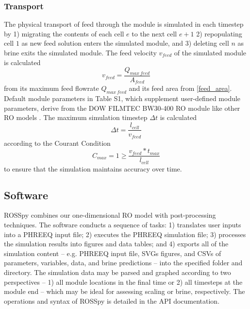 \subsubsection{Transport}
The physical transport of feed through the module is simulated in each timestep by 1) migrating the contents of each cell $e$ to the next cell $e+1$ 2) repopulating cell $1$ as new feed solution enters the simulated module, and 3) deleting cell $n$ as brine exits the simulated module. The feed velocity $v_{feed}$ of the simulated module is calculated
\begin{equation} \label{feed_velocity}
    v_{feed}=\frac{Q_{max~feed}}{A_{feed}}
\end{equation}
from its maximum feed flowrate $Q_{max~feed}$ and its feed area from \cref{feed_area}. Default module parameters in Table S1, which supplement user-defined module parameters, derive from the DOW FILMTEC BW30-400 RO module like other RO models \cite{Li2012OptimalDesalination}. The maximum simulation timestep $\Delta t$ is calculated
\begin{equation} \label{timestep}
    \Delta t=\frac{l_{cell}}{v_{feed}}
\end{equation}
according to the Courant Condition \cite{Gnedin2018EnforcingSchemes} 
\begin{equation} \label{courant_condition}
    C_{max}=1 \ge \frac{v_{feed}*t_{max}}{l_{cell}}
\end{equation}
to ensure that the simulation maintains accuracy over time.

\subsection{Software}
ROSSpy combines our one-dimensional RO model with post-processing techniques. The software conducts a sequence of tasks: 1) translates user inputs into a PHREEQ input file; 2) executes the PHREEQ simulation file; 3) processes the simulation results into figures and data tables; and 4) exports all of the simulation content -- e.g. PHREEQ input file, SVGs figures, and CSVs of parameters, variables, data, and brine predictions -- into the specified folder and directory. The simulation data may be parsed and graphed according to two perspectives -- 1) all module locations in the final time or 2) all timesteps at the module end -- which may be ideal for assessing scaling or brine, respectively. The operations and syntax of ROSSpy is detailed in the API documentation.

